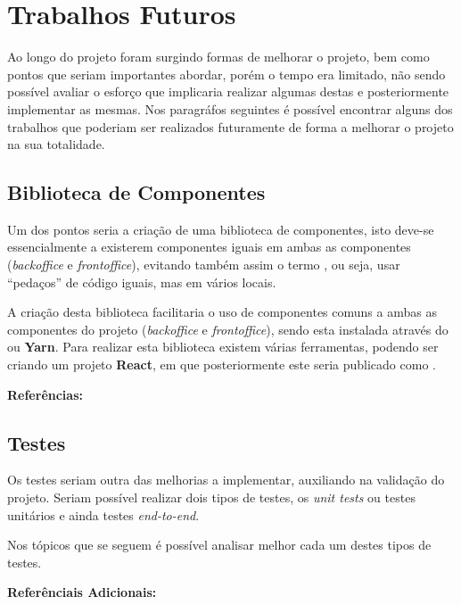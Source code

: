 \section{Trabalhos Futuros}

Ao longo do projeto foram surgindo formas de melhorar o projeto, bem como pontos que seriam importantes abordar, porém o tempo era limitado, não sendo possível avaliar o esforço que implicaria realizar algumas destas e posteriormente implementar as mesmas. Nos paragráfos seguintes é possível encontrar alguns dos trabalhos que poderiam ser realizados futuramente de forma a melhorar o projeto na sua totalidade.

\subsection{Biblioteca de Componentes}

Um dos pontos seria a criação de uma biblioteca de componentes, isto deve-se essencialmente a existerem componentes iguais em ambas as componentes (\textit{backoffice} e \textit{frontoffice}), evitando também assim o termo \textbf{\textit{}}, ou seja, usar ``pedaços'' de código iguais, mas em vários locais.

A criação desta biblioteca facilitaria o uso de componentes comuns a ambas as componentes do projeto (\textit{backoffice} e \textit{frontoffice}), sendo esta instalada através do \textbf{} ou \textbf{Yarn}. Para realizar esta biblioteca existem várias ferramentas, podendo ser criando um projeto \textbf{React}, em que posteriormente este seria publicado como .

\textbf{Referências:} \cite{publishReactPackage,createLibReact}

\subsection{Testes}

Os testes seriam outra das melhorias a implementar, auxiliando na validação do projeto.  Seriam possível realizar dois tipos de testes, os \textit{unit tests} ou testes unitários e ainda testes \textit{end-to-end}.

Nos tópicos que se seguem é possível analisar melhor cada um destes tipos de testes.

\vspace{20pt}

\textbf{Referênciais Adicionais:} \cite{reactEndToEndGuide,jestReact,endToEndCypress,endToEndJestPuppeteer,endToEndWJest,unitTestsReact,reactTesting,modernCypressTesting}

